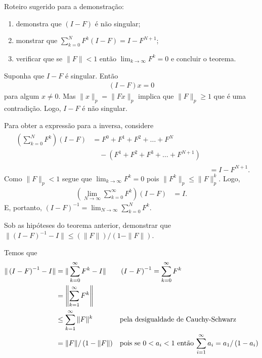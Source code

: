 \documentclass[a4paper,12pt, leqno, answers]{exam}
\begin{document}
\begin{questions}
    Roteiro sugerido para a demonstra\c{c}\~{a}o:
    \begin{enumerate}
        \item demonstra que $\left( I - F \right)$ \'{e} n\~{a}o singular;
        \item monstrar que $\sum_{k = 0}^N F^k \left( I - F \right) = I - F^{N + 1}$;
        \item verificar que se $\| F \| < 1$ ent\~{a}o $\lim_{k \rightarrow \infty} F^k = 0$ e concluir o teorema.
    \end{enumerate}
    \begin{solution}
        Suponha que $I - F$ \'{e} singular. Ent\~{a}o
        \begin{align*}
            \left( I - F \right) x = 0
        \end{align*}
        para algum $x \neq 0$. Mas $\| x \|_p = \| F x \|_p$ implica que $\| F \|_p \geq 1$ que \'{e} uma contradi\c{c}\~{a}o. Logo, $I - F$ \'{e} n\~{a}o singular.

        Para obter a express\~{a}o para a inversa, considere
        \begin{align*}
            \begin{split}
                \left( \sum_{k = 0}^N F^k \right) \left( I - F \right) &= F^0 + F^1 + F^2 + \ldots + F^N \\
                &\quad {}- \left( F^1 + F^2 + F^3 + \ldots + F^{N + 1} \right)
            \end{split} \\
            &= I - F^{N + 1}.
        \end{align*}
        Como $\| F \|_p < 1$ segue que $\lim_{k \to \infty} F^k = 0$ pois $\| F^k \|_p \leq \| F \|_p^k$. Logo,
        \begin{align*}
            \left( \lim_{N \to \infty} \sum_{k = 0}^\infty F^k \right) \left( I - F \right) &= I.
        \end{align*}
        E, portanto, $\left( I - F \right)^{-1} = \lim_{N \to \infty} \sum_{k = 0}^N F^k$.
    \end{solution}

    \question Sob as hip\'{o}teses do teorema anterior, demonstrar que $\| \left( I - F \right)^{-1} - I \| \leq \left( \| F \| \right) / \left( 1 - \| F \| \right)$.
    \begin{solution}
        Temos que
        \begin{align*}
            \| \left( I - F \right)^{-1} - I \| &= \| \sum_{k = 0}^\infty F^k - I \| && \left( I - F \right)^{-1} = \sum_{k = 0}^\infty F^k \\
            &= \left\| \sum_{k = 1}^\infty F^{k} \right\| \\
            &\leq \sum_{k = 1}^\infty \| F \|^k  && \text{pela desigualdade de Cauchy-Schwarz} \\
            &= \| F \| / \left( 1 - \| F \| \right) && \text{pois se $ 0 < a_i < 1$ ent\~{a}o $\sum_{i = 1}^\infty a_i = a_1 / \left( 1 - a_i \right)$} \\
        \end{align*}
    \end{solution}


\end{questions}
\end{document}
